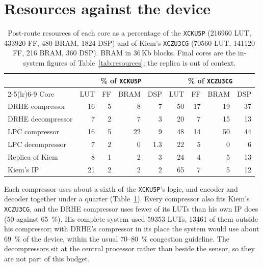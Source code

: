 \section{Resources against the device}
\label{sec:hw_resources}

\begin{table}[htbp]
\centering
\caption[Resources as a fraction of two devices]{Post-route resources of each
core as a percentage of the \texttt{XCKU5P} (\num{216960} LUT, \num{433920} FF,
480 BRAM, \num{1824} DSP) and of Kiem's \texttt{XCZU3CG} (\num{70560} LUT,
\num{141120} FF, 216 BRAM, 360 DSP). BRAM in 36\,Kb blocks. Final cores are the
in-system figures of Table~\ref{tab:resources}; the replica is out of context.}
\label{tab:hw_device}
\small
\setlength{\tabcolsep}{4pt}
\begin{tabular}{@{}lrrrrrrrr@{}}
\toprule
& \multicolumn{4}{c}{\% of \texttt{XCKU5P}} & \multicolumn{4}{c}{\% of \texttt{XCZU3CG}}\\
\cmidrule(lr){2-5}\cmidrule(lr){6-9}
Core & LUT & FF & BRAM & DSP & LUT & FF & BRAM & DSP\\
\midrule
DRHE compressor   & 16 & 5 & 8 & 7 & 50 & 17 & 19 & 37\\
DRHE decompressor & 7 & 2 & 7 & 3 & 20 & 7 & 15 & 13\\
LPC compressor    & 16 & 5 & 22 & 9 & 48 & 14 & 50 & 44\\
LPC decompressor  & 7 & 2 & 0 & 1.3 & 22 & 5 & 0 & 6\\
Replica of Kiem   & 8 & 1 & 2 & 3 & 24 & 4 & 5 & 13\\
Kiem's IP \cite{kiem2025} & 21 & 2 & 2 & 2 & 65 & 7 & 5 & 12\\
\bottomrule
\end{tabular}
\end{table}

Each compressor uses about a sixth of the \texttt{XCKU5P}'s logic, and encoder
and decoder together under a quarter (Table~\ref{tab:hw_device}). Every
compressor also fits Kiem's \texttt{XCZU3CG}, and the DRHE compressor uses
fewer of its LUTs than his own IP does (50 against \SI{65}{\percent}). His
complete system used \num{59353} LUTs, \num{13461} of them outside his
compressor; with DRHE's compressor in its place the system would use about
\SI{69}{\percent} of the device, within the usual 70--\SI{80}{\percent}
congestion guideline. The decompressors sit at the central processor rather
than beside the sensor, so they are not part of this budget.

